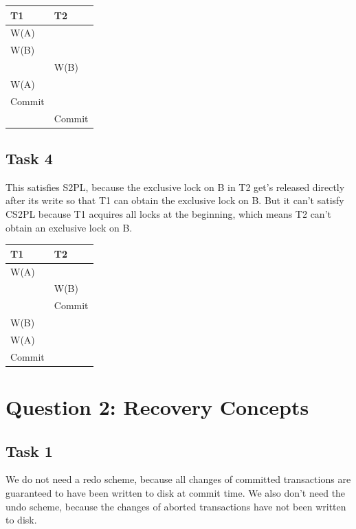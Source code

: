 \documentclass[12pt,a4paper]{article}
\begin{document}
\begin{table}[!htbp]
    \centering
    \begin{tabularx}{\textwidth}{l|l}
        \hline
        T1 & T2 \\ 
        \hline
        W(A)   &  	    \\
        W(B)   & 		\\        
               & W(B)	\\
        W(A)   & 		\\
        Commit & 		\\ 
        	   & Commit	\\      
        \hline
    \end{tabularx}
\end{table}


\subsection{Task 4}
This satisfies S2PL, because the exclusive lock on B in T2 get's released directly after its write so that T1 can obtain the exclusive lock on B.
But it can't satisfy CS2PL because T1 acquires all locks at the beginning, which means T2 can't obtain an exclusive lock on B.

\begin{table}[!htbp]
    \centering
    \begin{tabularx}{\textwidth}{l|l}
        \hline
        T1 & T2 \\ 
        \hline
        W(A)   &  	    \\
               & W(B)	\\
        	   & Commit	\\                         
        W(B)   & 		\\        
        W(A)   & 		\\
        Commit & 		\\     
        \hline
    \end{tabularx}
\end{table}


\section{Question 2: Recovery Concepts}
\subsection{Task 1}
We do not need a redo scheme, because all changes of committed transactions are guaranteed to have been written to disk at commit time.
We also don't need the undo scheme, because the changes of aborted transactions have not been written to disk.
\end{document}

